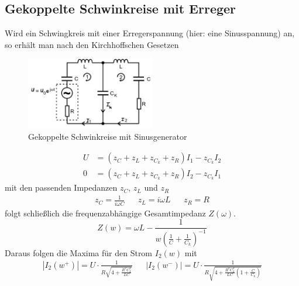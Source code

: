 \subsection{Gekoppelte Schwinkreise mit Erreger}
Wird ein Schwingkreis mit einer Erregerspannung (hier: eine Sinusspannung) an,
so erhält man nach den Kirchhoffschen Gesetzen
\begin{figure}[H]
    \centering
    \includegraphics[width=0.5\textwidth]{bilder/schwingkreis_sinus.jpg}
    \caption{Gekoppelte Schwinkreise mit Sinusgenerator \cite[303]{Anleitung}}
\end{figure} 
\begin{align}
    U&=\left(z_C+z_L+z_{C_k}+z_R\right)I_1-z_{C_k}I_2 \label{schw1}\\
    0&=\left(z_C+z_L+z_{C_k}+z_R\right)I_2-z_{C_k}I_1 \label{schw2}
\end{align}
mit den passenden Impedanzen $z_C$, $z_L$ und $z_R$
\begin{align*}
    z_C=\frac{1}{i\omega C}&
    &z_L=i \omega L&
    &z_R=R
\end{align*}
folgt schließlich die frequenzabhängige Gesamtimpedanz $Z\left(\omega\right)$.
\begin{equation}
    Z\left(w\right)=\omega L -\frac{1}{w\left(\frac{1}{C}+\frac{1}{C_k}\right)^{-1}}
\end{equation}
Daraus folgen die Maxima für den Strom $I_2\left(w\right)$ mit
\begin{align}
    |I_2(w^+)|=U\cdot\frac{1}{R\sqrt{4+\frac{R^2C_k^2}{LC}}}&&
    |I_2(w^-)|=U\cdot\frac{1}{R\sqrt{4+\frac{R^2C_k^2}{LC}(1+\frac{C}{C_k})}}
\end{align}

\label{sec:theorie}